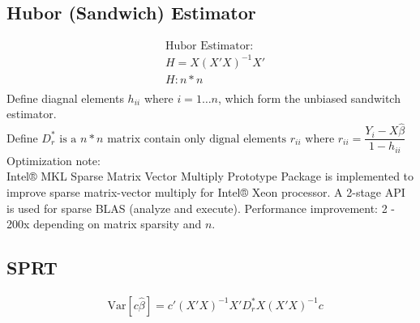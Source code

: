 \documentclass{article}
\newcommand{\Var}{\mathrm{Var}}
\begin{document}
\subsection{Hubor (Sandwich) Estimator}
\begin{equation*}
\label{Y}
\begin{aligned}
&\text{Hubor Estimator:}\\
&H = X(X'X)^{-1}X'\\
&H: n * n\\
\end{aligned}
\end{equation*}
Define diagnal elements $h_{ii}$ where $i = 1 \dots n$, which form the unbiased sandwitch estimator.\\
Define $D_r^* \text{ is a } n * n \text{ matrix contain only dignal elements } r_{ii} \text{ where } r_{ii} = \dfrac{Y_i - X\hat{\beta}}{1-h_{ii}}$\\

\noindent Optimization note:\\
Intel® MKL Sparse Matrix Vector Multiply Prototype Package is implemented to improve sparse matrix-vector multiply for Intel® Xeon processor. A 2-stage API is used for sparse BLAS (analyze and execute). Performance improvement: 2 - 200x depending on matrix sparsity and $n$.\\

\subsection{SPRT}
\begin{equation*}
    \label{var_c_beta_hat}
    \begin{aligned}
    &\Var[c\hat{\beta}] = c'(X'X)^{-1}X'D_r^*X(X'X)^{-1}c
    \end{aligned}
\end{equation*}\\
\end{document}
